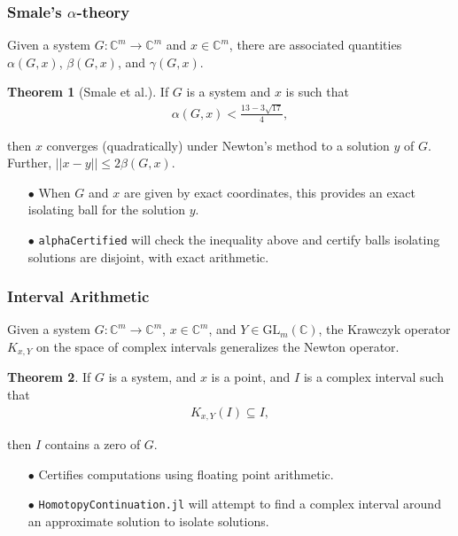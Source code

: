\documentclass{beamer}
\theoremstyle{definition}
\newtheorem{thm}{Theorem}
\begin{document}
\begin{frame}
\frametitle{Smale's $\alpha$-theory}
Given a system $G:\mathbb{C}^m\to\mathbb{C}^m$ and $x\in\mathbb{C}^m$, there are associated quantities $\alpha(G,x)$, $\beta(G,x)$, and $\gamma(G,x)$. 

\begin{thm}[Smale et al.]
\vspace{-.1cm}
If $G$ is a system and $x$ is such that
\vspace{-.2cm}
\begin{align*}
\alpha(G,x) < \frac{13-3\sqrt{17}}{4},
\end{align*}
\vspace{-.85cm}

then $x$ converges (quadratically) under Newton's method to a solution $y$ of $G$. Further, $||x-y||\le 2\beta(G,x)$.
\end{thm}

\begin{enumerate}
\item[$\bullet$] When $G$ and $x$ are given by exact coordinates, this provides an exact isolating ball for the solution $y$. 

\item[$\bullet$] \texttt{alphaCertified} will check the inequality above and certify balls isolating solutions are disjoint, with exact arithmetic. 
\end{enumerate}
\end{frame}




\begin{frame}
\frametitle{Interval Arithmetic}
Given a system $G:\mathbb{C}^m\to\mathbb{C}^m$, $x\in\mathbb{C}^m$, and $Y\in\text{GL}_m(\mathbb{C})$, the Krawczyk operator $K_{x,Y}$ on the space of complex intervals generalizes the Newton operator.

\begin{thm}
\vspace{-.1cm}
If $G$ is a system, and $x$ is a point, and $I$ is a complex interval such that 
\vspace{-.3cm}
\begin{align*}
K_{x,Y}(I)\subseteq I,
\end{align*}
\vspace{-.85cm} 

then $I$ contains a zero of $G$.
\end{thm}

\begin{enumerate}
\item[$\bullet$] Certifies computations using floating point arithmetic.

\item[$\bullet$] \texttt{HomotopyContinuation.jl} will attempt to find a complex interval around an approximate solution to isolate solutions.
\end{enumerate}
\end{frame}
\end{document}
